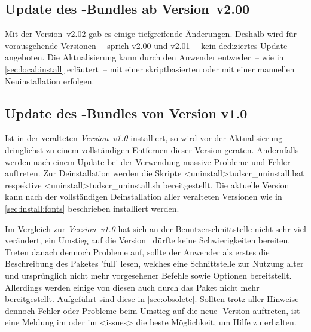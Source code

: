 \subsection{Update des \TUDScript-Bundles ab Version~v2.00}
%
Mit der Version~v2.02 gab es einige tiefgreifende Änderungen. Deshalb wird für 
vorausgehende Versionen~-- sprich v2.00 und v2.01~-- kein dediziertes Update 
angeboten. Die Aktualisierung kann durch den Anwender entweder~-- wie in 
\autoref{sec:local:install} erläutert~-- mit einer skriptbasierten oder mit 
einer manuellen Neuinstallation erfolgen.
%



\subsection{Update des \TUDScript-Bundles von Version v1.0}
%
Ist \TUDScript in der veralteten \emph{Version~v1.0} installiert, so wird vor 
der Aktualisierung dringlichst zu einem vollständigen Entfernen dieser Version 
geraten. Andernfalls werden nach einem Update bei der Verwendung massive 
Probleme und Fehler auftreten. Zur Deinstallation werden die Skripte 
\GitHubDownload*<uninstall>{tudscr_uninstall.bat} respektive
\GitHubDownload*<uninstall>{tudscr_uninstall.sh} bereitgestellt. Die aktuelle 
Version~\vTUDScript{} kann nach der vollständigen Deinstallation aller 
veralteten Versionen wie in \autoref{sec:install:fonts} beschrieben installiert 
werden.

Im Vergleich zur \emph{Version~v1.0} hat sich an der Benutzerschnittstelle 
nicht sehr viel verändert, ein Umstieg auf die Version~\vTUDScript{} dürfte 
keine Schwierigkeiten bereiten. Treten danach dennoch Probleme auf, sollte der 
Anwender als erstes die Beschreibung des Paketes 'full' 
lesen, welches eine Schnittstelle zur Nutzung alter und ursprünglich nicht mehr 
vorgesehener Befehle sowie Optionen bereitstellt. Allerdings werden einige von 
diesen auch durch das Paket  nicht mehr bereitgestellt. 
Aufgeführt sind diese in \autoref{sec:obsolete}. Sollten trotz aller Hinweise 
dennoch Fehler oder Probleme beim Umstieg auf die neue \TUDScript-Version 
auftreten, ist eine Meldung im \Forum oder im \GitHubRepo<issues> die 
beste Möglichkeit, um Hilfe zu erhalten.



